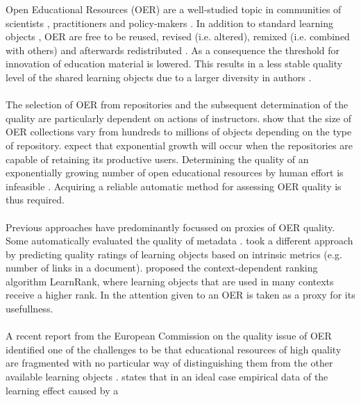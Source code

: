 Open Educational Resources (OER) are a well-studied topic in communities of
scientists \citep{Wiley2014, Hylen2012, Duval2010}, practitioners
\citep{Johnson2013, Yuan2013, Trendsurfoe2014} and policy-makers
\citep{Bussemaker2014,OECD2007}. In addition to standard learning objects
\citep{McGreal2004}, OER are free to be reused, revised (i.e. altered), remixed
(i.e. combined with others) and afterwards redistributed \citep{Hilton2010}. As
a consequence the threshold for innovation of education material is lowered.
This results in a less stable quality level of the shared learning objects due
to a larger diversity in authors \citep{Weller2010}.\\\\
\noindent
The selection of OER from repositories and the subsequent determination of the
quality are particularly dependent on actions of instructors. \citet{Ochoa2009a}
show that the size of OER collections vary from hundreds to
millions of objects depending on the type of repository. \citeauthor{Ochoa2009a}
expect that exponential growth will occur when the repositories are capable of
retaining its productive users. Determining the quality of an exponentially
growing number of open educational resources by human effort is infeasible
\citep{Cechinel2011, Ochoa2006, Zemsky2004}. Acquiring a reliable automatic
method for assessing OER quality is thus required.\\\\
\noindent
Previous approaches have predominantly focussed on proxies of OER quality. Some
automatically evaluated the quality of metadata \citep{Ochoa2009b, Tani2013}.
\citet{Cechinel2011, Cechinel2012} took a different approach by predicting quality ratings of
learning objects based on intrinsic metrics (e.g. number of links in a
document). \citet{Duval2006} proposed the context-dependent ranking algorithm
LearnRank, where learning objects that are used in many contexts receive a
higher rank. In \citep{Ochoa2006} the attention given to an OER is taken as a
proxy for its usefullness.\\\\
\noindent
A recent report from the European Commission on the quality issue of OER
identified one of the challenges to be that educational resources of high
quality are fragmented with no particular way of distinguishing them from the
other available learning objects \citep{Camilleri2014}. \citet{Duval2006}
states that in an ideal case empirical data of the learning effect caused by a
